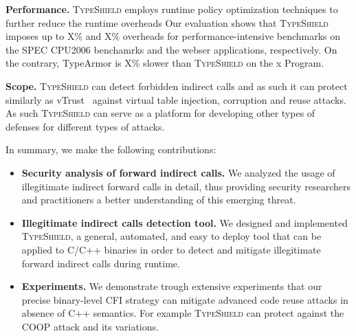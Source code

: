 \textbf{Performance.} \textsc{TypeShield} employs runtime policy optimization techniques to further reduce the runtime overheads
              Our evaluation shows that \textsc{TypeShield} imposes up to X\% and X\% overheads for performance-intensive benchmarks on the
              SPEC CPU2006 benchamrks and the webser applications, respectively. On
              the contrary, TypeArmor is X\% slower than \textsc{TypeShield}
              on the x Program.
              
\textbf{Scope.} \textsc{TypeShield} can detect forbidden indirect calls and as such it can protect similarly as vTrust~\cite{zhang:vtrust} against
              virtual table injection, corruption and reuse attacks. As such \textsc{TypeShield} can serve as a platform for developing other types of defenses for different 
              types of attacks.

In summary, we make the following contributions:
\label{Contribution}
\begin{itemize}
 \item \textbf{Security analysis of forward indirect calls.} 
 We analyzed the usage of illegitimate indirect forward calls in detail,
 thus providing security researchers and practitioners a better understanding of this emerging
 threat.

 \item \textbf{Illegitimate indirect calls detection tool.}
 We designed and implemented \textsc{TypeShield}, a general, automated, and easy to deploy tool
 that can be applied to C/C++ binaries in order to detect and mitigate illegitimate forward indirect calls 
 during runtime. 
 
 \item \textbf{Experiments.} We demonstrate trough extensive experiments that our precise
 binary-level CFI strategy can mitigate advanced code reuse attacks in absence of C++ semantics.
 For example \textsc{TypeShield} can protect against the COOP attack and its variations.
\end{itemize}

